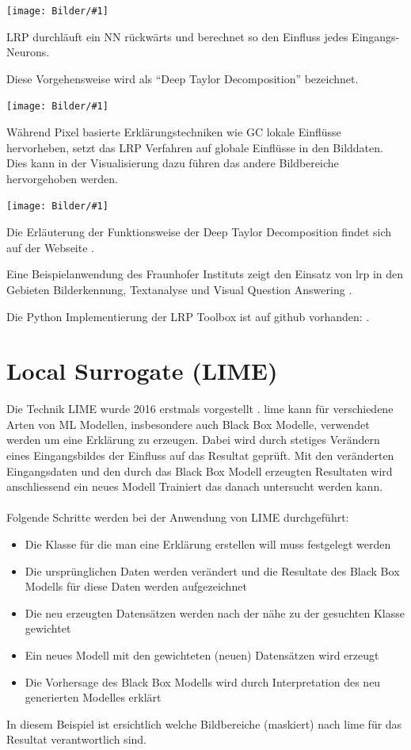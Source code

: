 \documentclass[
  12pt, %
  a4paper, %
  oneside, %
  openany, 
  numbers=noenddot, %
  BCOR=5mm, %
  parskip=half*, %
  thesis, %
]{bfhbook}
\newcommand{\imgTextQuelle}[4]{
\begin{center}
    \begin{minipage}[t]{0.6\textwidth}
    		\vspace{0pt}
		\texttt{[image: Bilder/\#1]}
		\caption{#2}
		\caption*{Quelle: #3}
	\end{minipage}\hfill
    \begin{minipage}[t]{0.4\textwidth}
    		\vspace{5pt}
    		\begin{FlushRight}
  		#4
  		\end{FlushRight}
    \end{minipage}
\end{center}
}
\newcommand{\fullImgQuelle}[3]{
\begin{center}
  \begin{minipage}{\linewidth}
    \centering
    \texttt{[image: Bilder/\#1]}
    \caption{#2}
    \caption*{Quelle: #3}
  \end{minipage}
\end{center}
}
\begin{document}
\imgTextQuelle{lrpgraph.PNG}{LRP Berechnung}{www.heatmapping.org}{LRP durchläuft ein \gls{NN} rückwärts und berechnet so den Einfluss jedes Eingangs-Neurons.

 Diese Vorgehensweise wird als ``Deep Taylor Decomposition'' bezeichnet.
 }
 
\fullImgQuelle{lrp-classification-example-cat.PNG}{Pixel basierte Relevanz}{Bach \parencite{Bach2015}}
 Während Pixel basierte Erklärungstechniken wie \Gls{GC} lokale Einflüsse hervorheben, setzt das LRP Verfahren auf globale Einflüsse in den Bilddaten. Dies kann in der Visualisierung dazu führen das andere Bildbereiche hervorgehoben werden.
\fullImgQuelle{lrp-example-cat.PNG}{Vergleich Pixel-wise und LRP }{Bach \parencite{Bach2015}}

Die  Erläuterung der Funktionsweise der Deep Taylor Decomposition findet sich auf der Webseite \parencite{deepTaylor}.

 Eine Beispielanwendung des Fraunhofer Instituts zeigt den Einsatz von \acrshort{lrp} in den Gebieten Bilderkennung, Textanalyse und Visual Question Answering \parencite{xaidemos}.

Die Python Implementierung der LRP Toolbox \parencite{JMLR:v17:15-618} ist auf github vorhanden: \parencite{lrpToolbox}.

\section{Local Surrogate (LIME)}
\label{lime}
Die Technik LIME wurde 2016 erstmals vorgestellt \parencite{Ribeiro2016}. 
\Gls{lime} kann für verschiedene Arten von  \Gls{ML} Modellen, insbesondere auch Black Box Modelle, verwendet werden um eine Erklärung zu erzeugen. Dabei wird durch stetiges Verändern eines Eingangsbildes der Einfluss auf das Resultat geprüft. Mit den veränderten Eingangsdaten und den durch das Black Box Modell erzeugten Resultaten wird anschliessend ein neues Modell Trainiert das danach untersucht werden kann.

\paragraph*{}
Folgende Schritte werden bei der Anwendung von LIME durchgeführt:
\begin{itemize}
	\item Die Klasse für die man eine Erklärung erstellen will muss festgelegt werden
	\item Die ursprünglichen Daten werden verändert und die Resultate des Black Box Modells für diese Daten werden aufgezeichnet
	\item Die neu erzeugten Datensätzen werden nach der nähe zu der gesuchten Klasse gewichtet
	\item Ein neues Modell mit den gewichteten (neuen) Datensätzen wird erzeugt
	\item Die Vorhersage des Black Box Modells wird durch Interpretation des neu generierten Modelles erklärt
\end{itemize}
\break
In diesem Beispiel ist ersichtlich welche Bildbereiche (maskiert) nach \gls{lime} für das Resultat verantwortlich sind.
\end{document}
